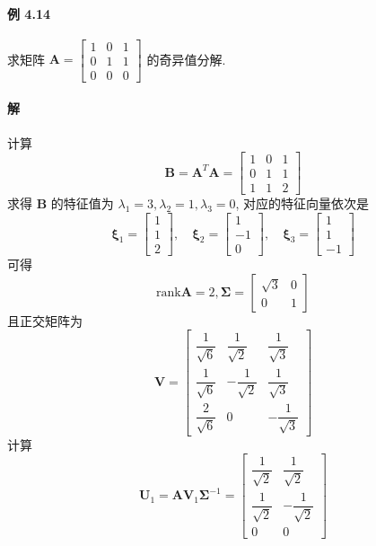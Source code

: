 \documentclass[12pt, a4paper, oneside, fontset=none]{ctexart}
\begin{document}
\paragraph*{例 4.14} 求矩阵 $\bm{A} = \begin{bmatrix}
        1 & 0 & 1 \\
        0 & 1 & 1 \\
        0 & 0 & 0
    \end{bmatrix}$ 的奇异值分解.

\paragraph*{解} 计算
$$
    \bm{B} = \bm{A}^T\bm{A} = \begin{bmatrix}
        1 & 0 & 1 \\
        0 & 1 & 1 \\
        1 & 1 & 2
    \end{bmatrix}
$$
求得 $\bm{B}$ 的特征值为 $\lambda_1 = 3, \lambda_2 = 1, \lambda_3 = 0$, 对应的特征向量依次是
$$
    \bm{\xi}_1 = \begin{bmatrix}
        1 \\
        1 \\
        2
    \end{bmatrix}, \quad
    \bm{\xi}_2 = \begin{bmatrix}
        1  \\
        -1 \\
        0
    \end{bmatrix}, \quad
    \bm{\xi}_3 = \begin{bmatrix}
        1 \\
        1 \\
        -1
    \end{bmatrix}
$$
可得
$$
    \mathrm{rank}\bm{A} = 2, \bm{\Sigma} = \begin{bmatrix}
        \sqrt{3} & 0 \\
        0        & 1
    \end{bmatrix}
$$
且正交矩阵为
$$
    \bm{V} = \begin{bmatrix}
        \dfrac{1}{\sqrt{6}} & \dfrac{1}{\sqrt{2}}  & \dfrac{1}{\sqrt{3}}  \\
        \dfrac{1}{\sqrt{6}} & -\dfrac{1}{\sqrt{2}} & \dfrac{1}{\sqrt{3}}  \\
        \dfrac{2}{\sqrt{6}} & 0                    & -\dfrac{1}{\sqrt{3}}
    \end{bmatrix}
$$
计算
$$
    \bm{U}_1 = \bm{AV}_1\bm{\Sigma}^{-1} = \begin{bmatrix}
        \dfrac{1}{\sqrt{2}} & \dfrac{1}{\sqrt{2}}  \\
        \dfrac{1}{\sqrt{2}} & -\dfrac{1}{\sqrt{2}} \\
        0                   & 0
    \end{bmatrix}
$$
\end{document}
